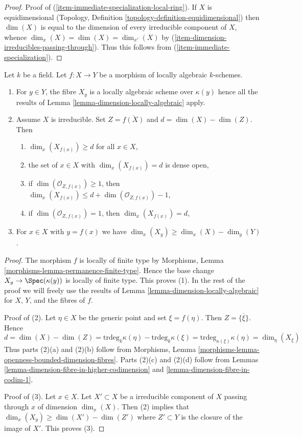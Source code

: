 \begin{proof}
\medskip\noindent
Proof of (\ref{item-immediate-specialization-local-ring}).
If $X$ is equidimensional
(Topology, Definition \ref{topology-definition-equidimensional})
then $\dim(X)$ is equal to the dimension of every irreducible
component of $X$, whence $\dim_x(X) = \dim(X) = \dim_{x'}(X)$
by (\ref{item-dimension-irreducibles-passing-through}).
Thus this follows from (\ref{item-immediate-specialization}).
\end{proof}

\begin{lemma}
\label{lemma-dimension-fibres-locally-algebraic}
Let $k$ be a field. Let $f : X \to Y$ be a morphism of locally algebraic
$k$-schemes.
\begin{enumerate}
\item For $y \in Y$, the fibre $X_y$ is a locally
algebraic scheme over $\kappa(y)$ hence all the results of
Lemma \ref{lemma-dimension-locally-algebraic} apply.
\item Assume $X$ is irreducible. Set $Z = \overline{f(X)}$ and
$d = \dim(X) - \dim(Z)$. Then
\begin{enumerate}
\item $\dim_x(X_{f(x)}) \geq d$ for all $x \in X$,
\item the set of $x \in X$ with $\dim_x(X_{f(x)}) = d$ is dense open,
\item if $\dim(\mathcal{O}_{Z, f(x)}) \geq 1$, then
$\dim_x(X_{f(x)}) \leq d + \dim(\mathcal{O}_{Z, f(x)}) - 1$,
\item if $\dim(\mathcal{O}_{Z, f(x)}) = 1$, then $\dim_x(X_{f(x)}) = d$,
\end{enumerate}
\item For $x \in X$ with $y = f(x)$ we have
$\dim_x(X_y) \geq \dim_x(X) - \dim_y(Y)$.
\end{enumerate}
\end{lemma}

\begin{proof}
The morphism $f$ is locally of finite type by
Morphisms, Lemma \ref{morphisms-lemma-permanence-finite-type}.
Hence the base change $X_y \to \Spec(\kappa(y))$ is locally
of finite type. This proves (1).
In the rest of the proof we will freely use the results
of Lemma \ref{lemma-dimension-locally-algebraic} for $X$, $Y$, and
the fibres of $f$.

\medskip\noindent
Proof of (2). Let $\eta \in X$ be the generic point and set
$\xi = f(\eta)$. Then $Z = \overline{\{\xi\}}$. Hence
$$
d = \dim(X) - \dim(Z) =
\text{trdeg}_k \kappa(\eta) - \text{trdeg}_k \kappa(\xi) =
\text{trdeg}_{\kappa(\xi)} \kappa(\eta) = \dim_\eta(X_\xi)
$$
Thus parts (2)(a) and (2)(b) follow from
Morphisms, Lemma \ref{morphisms-lemma-openness-bounded-dimension-fibres}.
Parts (2)(c) and (2)(d) follow from
Lemmas \ref{lemma-dimension-fibre-in-higher-codimension} and
\ref{lemma-dimension-fibre-in-codim-1}.

\medskip\noindent
Proof of (3). Let $x \in X$. Let $X' \subset X$ be a irreducible component
of $X$ passing through $x$ of dimension $\dim_x(X)$. Then (2) implies that
$\dim_x(X_y) \geq \dim(X') - \dim(Z')$ where $Z' \subset Y$
is the closure of the image of $X'$. This proves (3).
\end{proof}

